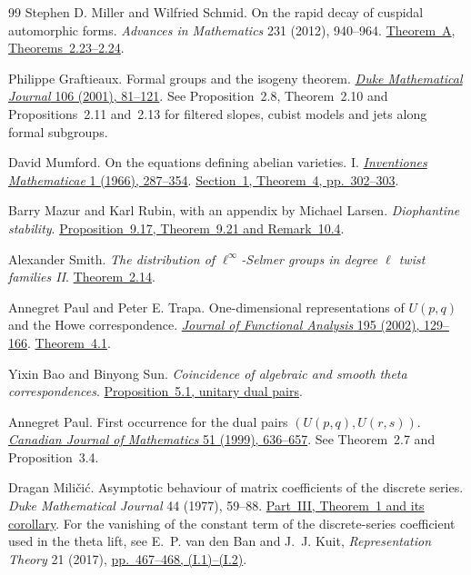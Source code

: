 \begin{thebibliography}{99}
Stephen D. Miller and Wilfried Schmid.
On the rapid decay of cuspidal automorphic forms.
\emph{Advances in Mathematics} 231 (2012), 940--964.
\href{https://arxiv.org/pdf/1106.2149\#page=3}{Theorem~A},
\href{https://arxiv.org/pdf/1106.2149\#page=11}{Theorems~2.23--2.24}.

Philippe Graftieaux.
Formal groups and the isogeny theorem.
\href{https://doi.org/10.1215/S0012-7094-01-10614-5}{\emph{Duke Mathematical Journal} 106 (2001), 81--121}.
See Proposition~2.8, Theorem~2.10 and Propositions~2.11 and~2.13
for filtered slopes, cubist models and jets along formal subgroups.

David Mumford.
On the equations defining abelian varieties. I.
\href{https://doi.org/10.1007/BF01389737}{\emph{Inventiones Mathematicae} 1 (1966), 287--354}.
\href{https://pazuki.perso.math.cnrs.fr/index_fichiers/Mumford66.pdf\#page=16}{Section~1, Theorem~4, pp.~302--303}.

Barry Mazur and Karl Rubin, with an appendix by Michael Larsen.
\emph{Diophantine stability}.
\href{https://arxiv.org/pdf/1503.04642v3}{Proposition~9.17, Theorem~9.21 and Remark~10.4}.

Alexander Smith.
\emph{The distribution of \(\ell^\infty\)-Selmer groups in degree
\(\ell\) twist families II}.
\href{https://arxiv.org/pdf/2207.05143v2\#page=10}{Theorem~2.14}.

Annegret Paul and Peter E. Trapa.
One-dimensional representations of \(U(p,q)\) and the Howe correspondence.
\href{https://doi.org/10.1006/jfan.2002.3974}{\emph{Journal of
Functional Analysis} 195 (2002), 129--166}.
\href{https://www.math.utah.edu/~ptrapa/char6_4.pdf\#page=9}{Theorem~4.1}.

Yixin Bao and Binyong Sun.
\emph{Coincidence of algebraic and smooth theta correspondences}.
\href{https://arxiv.org/pdf/1611.06298\#page=14}{Proposition~5.1, unitary dual pairs}.

Annegret Paul.
First occurrence for the dual pairs \((U(p,q),U(r,s))\).
\href{https://doi.org/10.4153/CJM-1999-029-6}{\emph{Canadian Journal
of Mathematics} 51 (1999), 636--657}.
See Theorem~2.7 and Proposition~3.4.

Dragan Mili\v{c}i\'c.
Asymptotic behaviour of matrix coefficients of the discrete series.
\emph{Duke Mathematical Journal} 44 (1977), 59--88.
\href{https://www.math.utah.edu/~ptrapa/math-library/milicic/milicic-asymptotics-duke-1977.pdf\#page=26}{Part~III, Theorem~1 and its corollary}.
For the vanishing of the constant term of the discrete-series coefficient used in the theta lift, see
E.~P. van den Ban and J.~J. Kuit, \emph{Representation Theory} 21 (2017),
\href{https://research-portal.uu.nl/ws/files/40857966/Cusp.pdf\#page=3}{pp.~467--468, (I.1)--(I.2)}.


\end{thebibliography}
